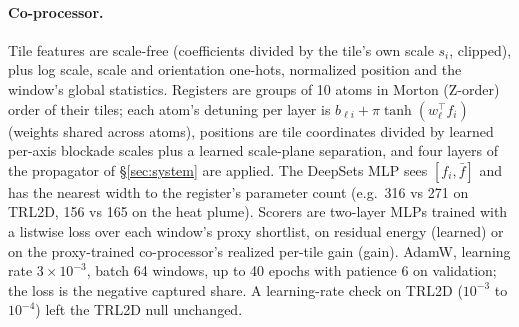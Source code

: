 \documentclass{article}
\begin{document}
\paragraph{Co-processor.} Tile features are scale-free (coefficients divided by the tile's own scale $s_i$, clipped),
plus log scale, scale and orientation one-hots, normalized position and the window's global statistics. Registers
are groups of 10 atoms in Morton (Z-order) order of their tiles; each atom's detuning per layer is
$b_{\ell i} + \pi\tanh(w_\ell^\top f_i)$ (weights shared across atoms), positions are tile coordinates divided by learned
per-axis blockade scales plus a learned scale-plane separation, and four layers of the propagator of
\S\ref{sec:system} are applied. The DeepSets MLP sees $[f_i, \bar f]$ and has the nearest width to the register's
parameter count (e.g.\ 316 vs 271 on TRL2D, 156 vs 165 on the heat plume). Scorers are two-layer MLPs trained with a
listwise loss over each window's proxy shortlist, on residual energy (learned) or on the proxy-trained co-processor's
realized per-tile gain (gain). AdamW, learning rate $3{\times}10^{-3}$, batch 64 windows, up to 40 epochs with patience 6
on validation; the loss is the negative captured share. A learning-rate check on TRL2D ($10^{-3}$ to $10^{-4}$) left the
TRL2D null unchanged.
\end{document}
